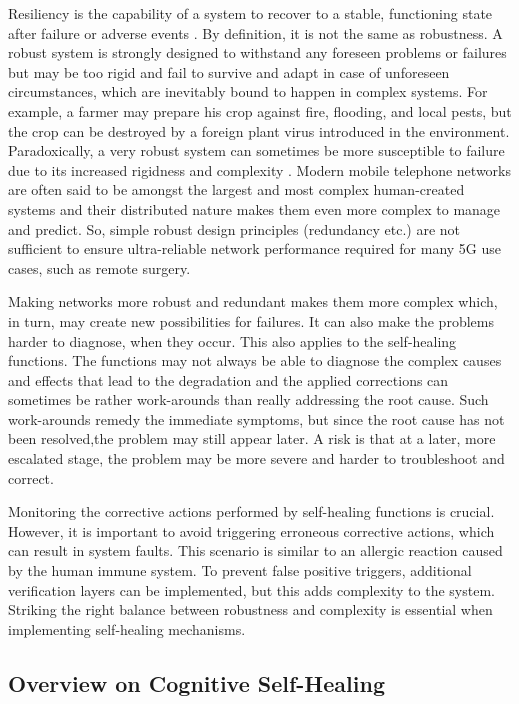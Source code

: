 Resiliency is the capability of a system to recover to a stable, functioning state after failure or adverse events \cite{zolli2012resilience}. By definition, it is not the same as robustness. A robust system is strongly designed to withstand any foreseen problems or failures but may be too rigid and fail to survive and adapt in case of unforeseen circumstances, which are inevitably bound to happen in complex systems. For example, a farmer may prepare his crop against fire, flooding, and local pests, but the crop can be destroyed by a foreign plant virus introduced in the environment. Paradoxically, a very robust system can sometimes be more susceptible to failure due to its increased rigidness and complexity \cite{zolli2012resilience}. Modern mobile telephone networks are often said to be amongst the largest and most complex human-created systems and their distributed nature makes them even more complex to manage and predict. So, simple robust design principles (redundancy etc.) are not sufficient to ensure ultra-reliable network performance required for many 5G use cases, such as remote surgery.

Making networks more robust and redundant makes them more complex which, in turn, may create new possibilities for failures. It can also make the problems harder to diagnose, when they occur. This also applies to the self-healing functions. The functions may not always be able to diagnose the complex causes and effects that lead to the degradation and the applied corrections can sometimes be rather work-arounds than really addressing the root cause. Such work-arounds remedy the immediate symptoms, but since the root cause has not been resolved,the problem may still appear later. A risk is that at a later, more escalated stage, the problem may be more severe and harder to troubleshoot and correct.

Monitoring the corrective actions performed by self-healing functions is crucial. However, it is important to avoid triggering erroneous corrective actions, which can result in system faults. This scenario is similar to an allergic reaction caused by the human immune system. To prevent false positive triggers, additional verification layers can be implemented, but this adds complexity to the system. Striking the right balance between robustness and complexity is essential when implementing self-healing mechanisms.

\subsection{Overview on Cognitive Self-Healing}

